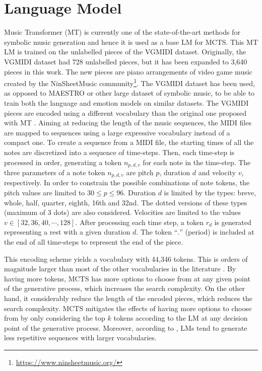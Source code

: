 

\section{Language Model}

Music Transformer (MT) \cite{huang2018music} is currently one of the state-of-the-art methods for symbolic music generation and hence it is used as a base LM for MCTS. This MT LM is trained on the unlabelled pieces of the VGMIDI dataset. Originally, the VGMIDI dataset had 728 unlabelled pieces, but it has been expanded to 3,640 pieces in this work. The new pieces are piano arrangements of video game music created by the NinSheetMusic community\footnote{\url{https://www.ninsheetmusic.org/}}. The VGMIDI dataset has been used, as opposed to MAESTRO \cite{hawthorne2018enabling} or other large dataset of symbolic music, to be able to train both the language and emotion models on similar datasets.
The VGMIDI pieces are encoded using a different vocabulary than the original one proposed with MT \cite{huang2018music}. Aiming at reducing the length of the music sequences, the MIDI files are mapped to sequences using a large expressive vocabulary instead of a compact one. To create a sequence from a MIDI file, the starting times of all the notes are discretized into a sequence of time-steps. Then, each time-step is processed in order, generating a token $n_{p, d, v}$ for each note in the time-step. The three parameters of a note token $n_{p, d, v}$ are pitch $p$, duration $d$ and velocity $v$, respectively. In order to constrain the possible combinations of note tokens, the pitch values are limited to $30 \leq p \leq 96$. Duration $d$ is limited by the types: breve, whole, half, quarter, eighth, 16th and 32nd. The dotted versions of these types (maximum of 3 dots) are also considered. Velocities are limited to the values $v \in [32, 36, 40, \cdots, 128]$. After processing each time step, a token $r_d$ is generated representing a rest with a given duration $d$. The token ``$.$'' (period) is included at the end of all time-steps to represent the end of the piece.

This encoding scheme yields a vocabulary with 44,346 tokens. This is orders of magnitude larger than most of the other vocabularies in the literature \cite{briot2017deep}. By having more tokens, MCTS has more options to choose from at any given point of the generative process, which increases the search complexity. On the other hand, it considerably reduce the length of the encoded pieces, which reduces the search complexity. MCTS mitigates the effects of having more options to choose from by only considering the top $k$ tokens according to the LM at any decision point of the generative process. Moreover, according to \citet{holtzman2018learning}, LMs tend to generate less repetitive sequences with larger vocabularies.

